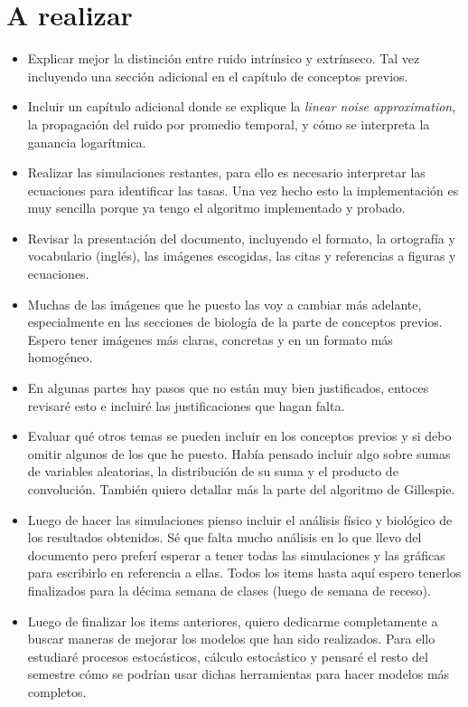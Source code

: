 \documentclass[12pt, letterpaper]{article}
\begin{document}
\section*{A realizar}
\begin{itemize}
  \item Explicar mejor la distinci\'on entre ruido intr\'insico y extr\'inseco. Tal vez incluyendo una secci\'on adicional en el cap\'itulo de conceptos previos.
  \item Incluir un cap\'itulo adicional donde se explique la \textit{linear noise approximation}, la propagaci\'on del ruido por promedio temporal, y c\'omo se interpreta la ganancia logar\'itmica.
  \item Realizar las simulaciones restantes, para ello es necesario interpretar las ecuaciones para identificar las tasas. Una vez hecho esto la implementaci\'on es muy sencilla porque ya tengo el algoritmo implementado y probado.
  \item Revisar la presentaci\'on del documento, incluyendo el formato, la ortograf\'ia y vocabulario (ingl\'es), las im\'agenes escogidas, las citas y referencias a figuras y ecuaciones.
  \item Muchas de las im\'agenes que he puesto las voy a cambiar m\'as adelante, especialmente en las secciones de biolog\'ia de la parte de conceptos previos. Espero tener im\'agenes m\'as claras, concretas y en un formato m\'as homog\'eneo.
  \item En algunas partes hay pasos que no est\'an muy bien justificados, entoces revisar\'e esto e incluir\'e las justificaciones que hagan falta.
  \item Evaluar qu\'e otros temas se pueden incluir en los conceptos previos y si debo omitir algunos de los que he puesto. Hab\'ia pensado incluir algo sobre sumas de variables aleatorias, la distribuci\'on de su suma y el producto de convoluci\'on. Tambi\'en quiero detallar m\'as la parte del algoritmo de Gillespie.
  \item Luego de hacer las simulaciones pienso incluir el an\'alisis f\'isico y biol\'ogico de los resultados obtenidos. S\'e que falta mucho an\'alisis en lo que llevo del documento pero prefer\'i esperar a tener todas las simulaciones y las gr\'aficas para escribirlo en referencia a ellas. Todos los items hasta aqu\'i espero tenerlos finalizados para la d\'ecima semana de clases (luego de semana de receso).
  \item Luego de finalizar los items anteriores, quiero dedicarme completamente a buscar maneras de mejorar los modelos que han sido realizados. Para ello estudiar\'e procesos estoc\'asticos, c\'alculo estoc\'astico y pensar\'e el resto del semestre c\'omo se podr\'ian usar dichas herramientas para hacer modelos m\'as completos.
\end{itemize}
\end{document}
